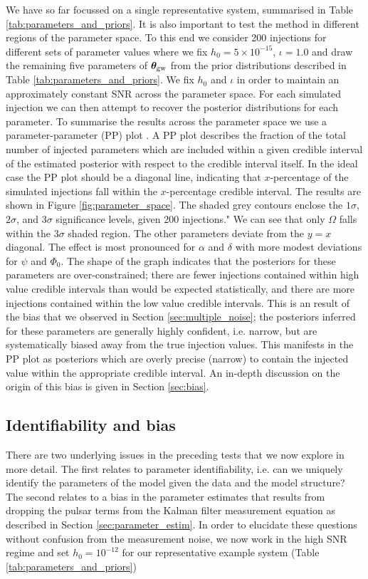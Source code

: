 \documentclass[fleqn,usenatbib,useAMS]{mnras}
\begin{document}
We have so far focussed on a single representative system, summarised in Table \ref{tab:parameters_and_priors}. It is also important to test the method in different regions of the parameter space. To this end we consider 200 injections for different sets of parameter values where we fix $h_0 = 5 \times 10^{-15}$, $\iota =1.0$ and draw the remaining five parameters of $\boldsymbol{\theta}_{\rm gw}$ from the prior distributions described in Table \ref{tab:parameters_and_priors}. We fix $h_0$ and $\iota$ in order to maintain an approximately constant SNR across the parameter space. For each simulated injection we can then attempt to recover the posterior distributions for each parameter. To summarise the results across the parameter space we use a parameter-parameter (PP) plot \citep{doi:10.1198/106186006X136976}. A PP plot describes the fraction of the total number of injected parameters which are included within a given credible interval of the estimated posterior with respect to the credible interval itself. In the ideal case the PP plot should be a diagonal line, indicating that $x$-percentage of the simulated injections fall within the $x$-percentage credible interval. The results are shown in Figure \ref{fig:parameter_space}. The shaded grey contours enclose the $1\sigma$, $2\sigma$, and $3\sigma$ significance levels, given 200 injections."
We can see that only $\Omega$ falls within the $3\sigma$ shaded region. The other parameters deviate from the $y=x$ diagonal. The effect is most pronounced for $\alpha$ and $\delta$ with more modest deviations for $\psi$ and $\Phi_0$. The shape of the graph indicates that the posteriors for these parameters are over-constrained; there are fewer injections contained within high value credible intervals than would be expected statistically, and there are more injections contained within the low value credible intervals. This is an result of the bias that we observed in Section \ref{sec:multiple_noise}; the posteriors inferred for these parameters are generally highly confident, i.e. narrow, but are systematically biased away from the true injection values. This manifests in the PP plot as posteriors which are overly precise (narrow) to contain the injected value within the appropriate credible interval. An in-depth discussion on the origin of this bias is given in Section \ref{sec:bias}. 




\subsection{Identifiability and bias}
There are two underlying issues in the preceding tests that we now explore in more detail. The first relates to parameter identifiability, i.e. can we uniquely identify the parameters of the model given the data and the model structure? The second relates to a bias in the parameter estimates that results from dropping the pulsar terms from the Kalman filter measurement equation as described in Section \ref{sec:parameter_estim}. In order to elucidate these questions without confusion from the measurement noise, we now work in the high SNR regime and set $h_0 = 10^{-12}$ for our representative example system (Table \ref{tab:parameters_and_priors})
\end{document}
